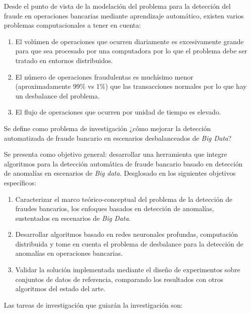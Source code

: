  Desde el punto de vista de la modelaci\'{o}n del problema para la detecci\'{o}n del fraude en operaciones bancarias mediante aprendizaje autom\'{a}tico, existen varios problemas computacionales a tener en cuenta:
 
 \begin{enumerate}
 	\item El vol\'{u}men de operaciones que ocurren diariamente es excesivamente grande para que sea procesado por una computadora por lo que el problema debe ser tratado en entornos distribuidos.
 	\item El n\'{u}mero de operaciones fraudulentas es much\'{i}simo menor (aproximadamente 99\% vs 1\%) que las transacciones normales por lo que hay un desbalance del problema.
 	\item El flujo de operaciones que ocurren por unidad de tiempo es elevado.
 \end{enumerate}

Se define como problema de investigaci\'{o}n ¿c\'{o}mo mejorar la detecci\'{o}n automatizada de fraude bancario en escenarios desbalanceados de \textit{Big Data}?

Se presenta como objetivo general: desarrollar una herramienta que integre algoritmos para la detecci\'{o}n autom\'{a}tica de fraude bancario basado en detecci\'{o}n de anomal\'{i}as en escenarios de \textit{Big data}. Desglosado en los siguientes objetivos espec\'{i}ficos:

\begin{enumerate}
	\item Caracterizar el marco te\'{o}rico-conceptual del problema de la detecci\'{o}n de fraudes bancarios, los enfoques basados en detecci\'{o}n de anomal\'{i}as, sustentados en escenarios de \textit{Big Data}.
	\item Desarrollar algoritmos basado en redes neuronales profundas, computaci\'{o}n distribuida y tome en cuenta el problema de desbalance para la detecci\'{o}n de anomal\'{i}as en operaciones bancarias.
	\item Validar la soluci\'{o}n implementada mediante el dise\~{n}o de experimentos sobre conjuntos de datos de referencia, comparando los resultados con otros algoritmos del estado del arte.
\end{enumerate}

Las tareas de investigaci\'{o}n que guiar\'{a}n la investigaci\'{o}n son:

